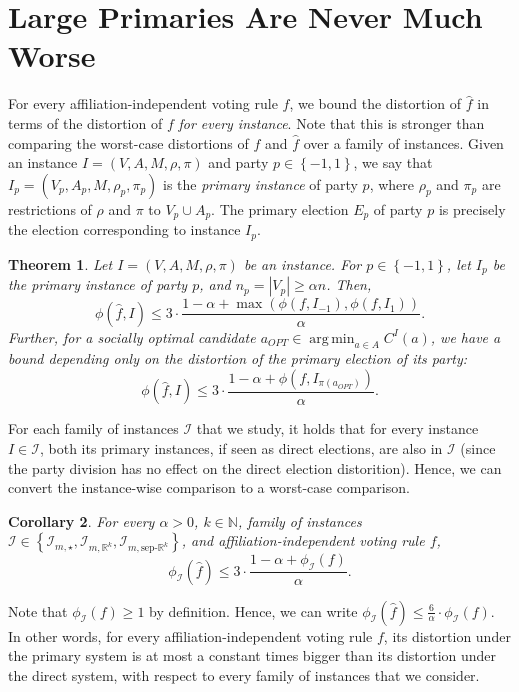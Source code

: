 \documentclass[letterpaper]{article} %
\newtheorem{theorem}{Theorem}
\newtheorem{corollary}[theorem]{Corollary}
\theoremstyle{definition}
\newcommand{\set}[1]{\left\{#1\right\}}
\renewcommand{\hat}{\widehat}
\DeclareMathOperator*{\argmin}{\arg\,\min}
\newcommand{\bbN}{\mathbb{N}}
\newcommand{\bbR}{\mathbb{R}}
\newcommand{\calI}{\mathcal{I}}
\newcommand{\pleft}{-1}
\newcommand{\pright}{1}
\newcommand{\all}{\star}
\newcommand{\sep}{\textrm{sep-}}
\newcommand{\euc}[1]{\bbR^{#1}}
\newcommand{\eucsep}[1]{\sep\euc{#1}}
\newcommand{\I}{\calI}
\begin{document}
\section{Large Primaries Are Never Much Worse}
\label{sec:large-primaries-good}
For every affiliation-independent voting rule $f$, we bound the distortion of $\hat{f}$ in terms of the distortion of $f$ \emph{for every instance}. Note that this is stronger than comparing the worst-case distortions of $f$ and $\hat{f}$ over a family of instances.
Given an instance $I = (V,A,M,\rho,\pi)$ and party $p \in \set{\pleft,\pright}$, we say that $I_p = (V_p,A_p,M,\rho_p,\pi_p)$ is the \emph{primary instance} of party $p$, where $\rho_p$ and $\pi_p$ are restrictions of $\rho$ and $\pi$ to $V_p \cup A_p$. The primary election $E_p$ of party $p$ is precisely the election corresponding to instance $I_p$.
\begin{theorem}
	Let $I = (V,A,M,\rho,\pi)$ be an instance. For $p \in \set{\pleft,\pright}$, let $I_p$ be the primary instance of party $p$, and $n_p = |V_p| \ge \alpha n$. Then,
	$$
	\phi(\hat{f},I) \le 3 \cdot \frac{1-\alpha+\max(\phi(f,I_{\pleft}),\phi(f,I_{\pright}))}{\alpha}.
	$$
	Further, for a socially optimal candidate $a_{OPT} \in \argmin_{a \in A} C^I(a)$, we have a bound depending only on the distortion of the primary election of its party:
	$$
	\phi(\hat{f},I) \le 3 \cdot \frac{1-\alpha+\phi(f,I_{\pi(a_{OPT})})}{\alpha}.
	$$
\label{thm:large-primaries-good}
\end{theorem}
For each family of instances $\I$ that we study, it holds that for every instance $I \in \calI$, both its primary instances, if seen as direct elections, are also in $\I$ (since the party division has no effect on the direct election distorition). Hence, we can convert the instance-wise comparison to a worst-case comparison.
\begin{corollary}
\label{cor:large-primaries-good}
	For every $\alpha > 0$, $k \in \bbN$, family of instances $\I \in \set{\I_{m,\all},\I_{m,\euc{k}},\I_{m,\eucsep{k}}}$, and affiliation-independent voting rule $f$,
	$$
	\phi_{\I}(\hat{f}) \le 3\cdot \frac{1-\alpha+\phi_{\I}(f)}{\alpha}.
	$$
\end{corollary}
Note that $\phi_{\I}(f) \ge 1$ by definition. Hence, we can write $\phi_{\I}(\hat{f}) \le \frac{6}{\alpha} \cdot \phi_{\I}(f)$. In other words, for every affiliation-independent voting rule $f$, its distortion under the primary system is at most a constant times bigger than its distortion under the direct system, with respect to every family of instances that we consider. %
\end{document}
